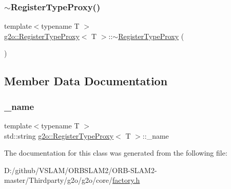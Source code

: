 \mbox{\label{classg2o_1_1_register_type_proxy_ab8469d11a8e3548e74b1de4b3a332d4e}} 
\subsubsection{\texorpdfstring{$\sim$\+Register\+Type\+Proxy()}{~RegisterTypeProxy()}}
{\footnotesize\ttfamily template$<$typename T $>$ \\
\mbox{\hyperlink{classg2o_1_1_register_type_proxy}{g2o\+::\+Register\+Type\+Proxy}}$<$ T $>$\+::$\sim$\mbox{\hyperlink{classg2o_1_1_register_type_proxy}{Register\+Type\+Proxy}} (\begin{DoxyParamCaption}{ }\end{DoxyParamCaption})\hspace{0.3cm}{\ttfamily [inline]}}



\subsection{Member Data Documentation}
\mbox{\label{classg2o_1_1_register_type_proxy_a34c9e807a21fc0dbafd8980c17bf77f9}} 
\subsubsection{\texorpdfstring{\+\_\+name}{\_name}}
{\footnotesize\ttfamily template$<$typename T $>$ \\
std\+::string \mbox{\hyperlink{classg2o_1_1_register_type_proxy}{g2o\+::\+Register\+Type\+Proxy}}$<$ T $>$\+::\+\_\+name\hspace{0.3cm}{\ttfamily [private]}}



The documentation for this class was generated from the following file\+:\begin{DoxyCompactItemize}
\item 
D\+:/github/\+V\+S\+L\+A\+M/\+O\+R\+B\+S\+L\+A\+M2/\+O\+R\+B-\/\+S\+L\+A\+M2-\/master/\+Thirdparty/g2o/g2o/core/\mbox{\hyperlink{factory_8h}{factory.\+h}}\end{DoxyCompactItemize}
